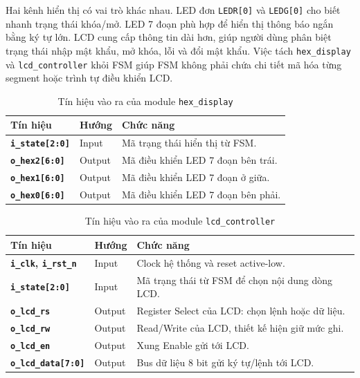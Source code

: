 \documentclass[13pt,a4paper]{article}
\begin{document}
Hai kênh hiển thị có vai trò khác nhau. LED đơn \texttt{LEDR[0]} và \texttt{LEDG[0]} cho biết nhanh trạng thái khóa/mở. LED 7 đoạn phù hợp để hiển thị thông báo ngắn bằng ký tự lớn. LCD cung cấp thông tin dài hơn, giúp người dùng phân biệt trạng thái nhập mật khẩu, mở khóa, lỗi và đổi mật khẩu. Việc tách \texttt{hex\_display} và \texttt{lcd\_controller} khỏi FSM giúp FSM không phải chứa chi tiết mã hóa từng segment hoặc trình tự điều khiển LCD.

\begin{table}[H]
\centering
\caption{Tín hiệu vào ra của module \texttt{hex\_display}}
\label{tab:io_hex_display}
\begin{tabularx}{\textwidth}{|>{\bfseries}p{3.4cm}|p{1.8cm}|X|}
\hline
\textbf{Tín hiệu} & \textbf{Hướng} & \textbf{Chức năng}\\
\hline
\texttt{i\_state[2:0]} & Input & Mã trạng thái hiển thị từ FSM.\\
\hline
\texttt{o\_hex2[6:0]} & Output & Mã điều khiển LED 7 đoạn bên trái.\\
\hline
\texttt{o\_hex1[6:0]} & Output & Mã điều khiển LED 7 đoạn ở giữa.\\
\hline
\texttt{o\_hex0[6:0]} & Output & Mã điều khiển LED 7 đoạn bên phải.\\
\hline
\end{tabularx}
\end{table}

\begin{table}[H]
\centering
\caption{Tín hiệu vào ra của module \texttt{lcd\_controller}}
\label{tab:io_lcd_controller}
\begin{tabularx}{\textwidth}{|>{\bfseries}p{3.4cm}|p{1.8cm}|X|}
\hline
\textbf{Tín hiệu} & \textbf{Hướng} & \textbf{Chức năng}\\
\hline
\texttt{i\_clk}, \texttt{i\_rst\_n} & Input & Clock hệ thống và reset active-low.\\
\hline
\texttt{i\_state[2:0]} & Input & Mã trạng thái từ FSM để chọn nội dung dòng LCD.\\
\hline
\texttt{o\_lcd\_rs} & Output & Register Select của LCD: chọn lệnh hoặc dữ liệu.\\
\hline
\texttt{o\_lcd\_rw} & Output & Read/Write của LCD, thiết kế hiện giữ mức ghi.\\
\hline
\texttt{o\_lcd\_en} & Output & Xung Enable gửi tới LCD.\\
\hline
\texttt{o\_lcd\_data[7:0]} & Output & Bus dữ liệu 8 bit gửi ký tự/lệnh tới LCD.\\
\hline
\end{tabularx}
\end{table}
\end{document}
